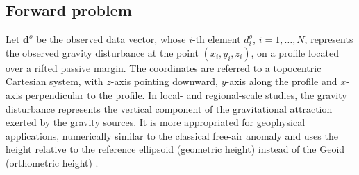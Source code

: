 \documentclass[manuscript]{geophysics}
\begin{document}
\subsection{Forward problem}


Let $\mathbf{d}^{o}$ be the observed data vector, whose $i$-th element $d^{o}_{i}$, 
$i = 1, \dots, N$, represents the observed gravity disturbance \citep{heiskanen-moritz1967} 
at the point $(x_{i}, y_{i}, z_{i})$, on a profile located over a rifted passive margin. 
The coordinates are referred to a topocentric Cartesian system, with $z$-axis pointing
downward, $y$-axis along the profile and $x$-axis perpendicular to the profile. 
In local- and regional-scale studies, the gravity disturbance 
represents the vertical component of the gravitational attraction exerted by the gravity 
sources. It is more appropriated for geophysical applications,
numerically similar to the classical free-air anomaly and uses the height relative to the
reference ellipsoid (geometric height) instead of the Geoid (orthometric height)
\citep{li2001, fairhead2003, hackney-featherstone2003, hinze2005, vajda-etal2006, vajda-etal2007}.
\end{document}
